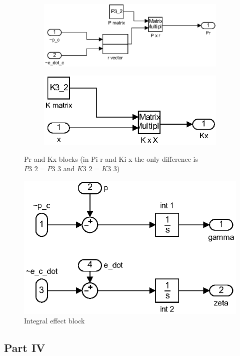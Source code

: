 \begin{figure}[H]
\graphicspath{ {Part3_pictures/}}
\begin{subfigure}{0.5\textwidth}
    \includegraphics[width=0.9\linewidth]{Part3_pictures/p3p2_Pr.eps} 
\end{subfigure}
\begin{subfigure}{0.5\textwidth}
    \includegraphics[width=0.9\linewidth]{Part3_pictures/p3p2_Kx.eps}
\end{subfigure}
\caption{Pr and Kx blocks (in Pi r and Ki x the only difference is $P3\_2 = P3\_3$ and $K3\_2 = K3\_3$)}
\end{figure}

\begin{figure}[H]
    \begin{center}
    \includegraphics[width=0.5\linewidth]{Part3_pictures/p3p3_int.eps}
    \caption{Integral effect block}
    \end{center}
\end{figure}

\subsection{Part IV}

